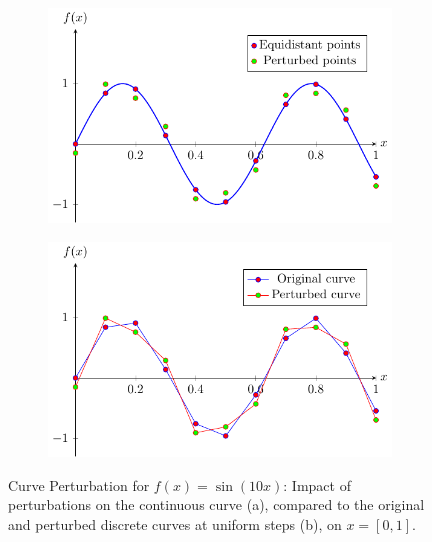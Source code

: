 \begin{figure}
    \centering
    \begin{subfigure}[b]{0.45\textwidth}
        \includegraphics[width=\textwidth]{figures/perturbation-curve-cont/fig.pdf}
        \caption{}
        \label{fig:perturbation-curve-cont}
    \end{subfigure}
    \hfill
    \begin{subfigure}[b]{0.45\textwidth}
        \includegraphics[width=\textwidth]{figures/perturbation-curve-disc/fig.pdf}
        \caption{}
        \label{fig:perturbation-curve-disc}
    \end{subfigure}
    \caption{Curve Perturbation for \( f(x) = \sin(10x) \): Impact of perturbations on the continuous curve (a), compared to the original and perturbed discrete curves at uniform steps (b), on \( x = [0, 1] \).}
    \label{fig:perturbation-curve}
\end{figure}

